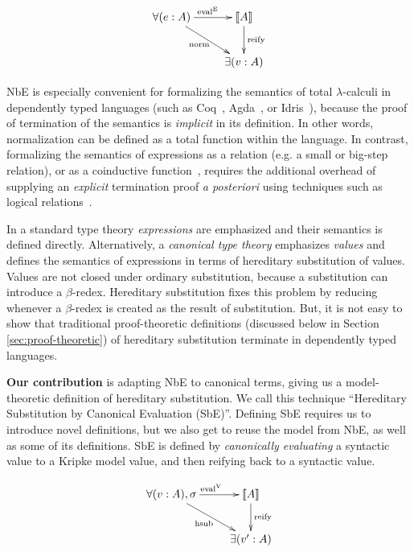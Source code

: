 \documentclass{llncs}
\newcommand{\refsec}[1]{Section \ref{sec:#1}}
\def\eval{\fun{eval}^\con{E}}
\def\cevalv{\fun{eval}^\con{V}}
\newcommand{\ascribe}[2]{(#1 : #2)}
\newcommand{\el}[1]{\llbracket #1 \rrbracket}
\newcommand{\con}[1]{\textmd{#1}}
\newcommand{\fun}[1]{\textmd{#1}}
\begin{document}
\begin{displaymath}
    \xymatrix{
          {\forall (e : A)} 
          \ar[dr]_{\fun{norm}}
          \ar[r]^{\eval}
        & {\el{A}}
          \ar[d]^{\large{\fun{reify}}}
\\      & \exists (v : A) }
\end{displaymath}

NbE is especially convenient for formalizing the semantics of total
$\lambda$-calculi in dependently typed languages (such as
Coq~\cite{TODO}, Agda~\cite{TODO}, or Idris~\cite{TODO}), because the
proof of termination of the semantics is \textit{implicit} in its
definition. In other words, normalization can be defined as a total
function within the language.
In contrast, formalizing the semantics of expressions as a
relation (e.g. a small or big-step relation), or as a
coinductive function~\cite{TODO}, requires the additional overhead
of supplying an \textit{explicit}
termination proof \textit{a posteriori} using techniques such as
logical relations~\cite{TODO}.

In a standard type theory \textit{expressions} are emphasized and
their semantics is defined directly. Alternatively, a
\textit{canonical type theory} emphasizes \textit{values} and defines
the semantics of expressions in terms of hereditary substitution of
values. Values are not closed under ordinary substitution, because a
substitution can introduce a $\beta$-redex. Hereditary substitution
fixes this problem by reducing whenever a $\beta$-redex is created as
the result of substitution. But, it is not easy to show that
traditional proof-theoretic definitions (discussed below in
\refsec{proof-theoretic}) of hereditary substitution terminate in
dependently typed languages.

\textbf{Our contribution} is adapting NbE to canonical terms, giving us a model-theoretic
definition of hereditary substitution. We call this technique
``Hereditary Substitution by Canonical Evaluation (SbE)''. Defining
SbE requires us to introduce novel definitions, but we also get to
reuse the model from NbE, as well as some of its definitions. SbE is
defined by \textit{canonically evaluating} a syntactic value to a
Kripke model value, and then reifying back to a syntactic value.

\begin{displaymath}
    \xymatrix{
          \forall{\ascribe{v}{A}, \sigma}
          \ar[dr]_{\fun{hsub}}
          \ar[r]^{\cevalv}
        & {\el{A}}
          \ar[d]^{\large{\fun{reify}}}
\\      & \exists{\ascribe{v'}{A}} }
\end{displaymath}
\end{document}
